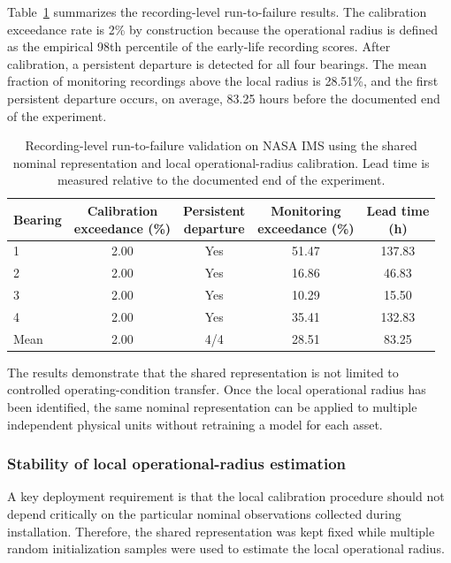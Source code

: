 \documentclass[11pt,a4paper]{article}
\begin{document}
Table~\ref{tab:nasa-main-results} summarizes the recording-level
run-to-failure results. The calibration exceedance rate is 2\% by
construction because the operational radius is defined as the empirical
98th percentile of the early-life recording scores. After calibration, a
persistent departure is detected for all four bearings. The mean fraction
of monitoring recordings above the local radius is 28.51\%, and the first
persistent departure occurs, on average, 83.25 hours before the documented
end of the experiment.

\begin{table}[H]
\centering
\caption{Recording-level run-to-failure validation on NASA IMS using the
shared nominal representation and local operational-radius calibration.
Lead time is measured relative to the documented end of the experiment.}
\label{tab:nasa-main-results}

\small
\setlength{\tabcolsep}{6pt}
\begin{tabular}{lcccc}
\toprule
Bearing &
\shortstack{Calibration\\exceedance (\%)} &
\shortstack{Persistent\\departure} &
\shortstack{Monitoring\\exceedance (\%)} &
\shortstack{Lead time\\(h)} \\
\midrule
1 & 2.00 & Yes & 51.47 & 137.83 \\
2 & 2.00 & Yes & 16.86 & 46.83  \\
3 & 2.00 & Yes & 10.29 & 15.50  \\
4 & 2.00 & Yes & 35.41 & 132.83 \\
\midrule
Mean & 2.00 & 4/4 & 28.51 & 83.25 \\
\bottomrule
\end{tabular}
\end{table}


The results demonstrate that the shared representation is not limited to
controlled operating-condition transfer. Once the local operational radius
has been identified, the same nominal representation can be applied to
multiple independent physical units without retraining a model for each
asset.


\subsubsection{Stability of local operational-radius estimation}

A key deployment requirement is that the local calibration procedure should
not depend critically on the particular nominal observations collected
during installation. Therefore, the shared representation was kept fixed
while multiple random initialization samples were used to estimate the
local operational radius.
\end{document}
